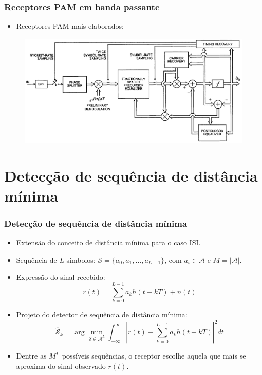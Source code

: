 \begin{frame}
	\frametitle{Receptores PAM em banda passante}

	\begin{itemize}
	    \item Receptores PAM mais elaborados:
	\end{itemize}
	\begin{figure}[t]	
	    \begin{center}
	    \includegraphics[width=0.9\columnwidth]{figs/pam_30}
	    \end{center} 
	\end{figure}
\end{frame}

\section{Detecção de sequência de distância mínima}

\begin{frame}
	\frametitle{Detecção de sequência de distância mínima}

	\begin{itemize}
	    \item Extensão do conceito de distância mínima para o caso ISI.
	    \item Sequência de $L$ símbolos: $ \mathcal{S} = \{ a_0, a_1, \ldots, a_{L-1} \}$, com $a_i \in \mathcal{A}$ e $M=|\mathcal{A}|$.
	    \item Expressão do sinal recebido:
	    \begin{equation*}
		r(t) = \sum_{k=0}^{L-1} a_k h(t-kT) + n(t)
	    \end{equation*}
	    \item Projeto do detector de sequência de distância mínima:
	    \begin{equation*}
		\hat{\mathcal{S}}_k = \arg \min_{\mathcal{S} \in \mathcal{A}^L} \int_{-\infty}^{\infty} \left| r(t) - \sum_{k=0}^{L-1} a_k h(t-kT) \right|^2 dt
	    \end{equation*}
	    \item Dentre as $M^L$ possíveis sequências, o receptor escolhe aquela que mais se aproxima do sinal observado $r(t)$.
	\end{itemize}	
\end{frame}

